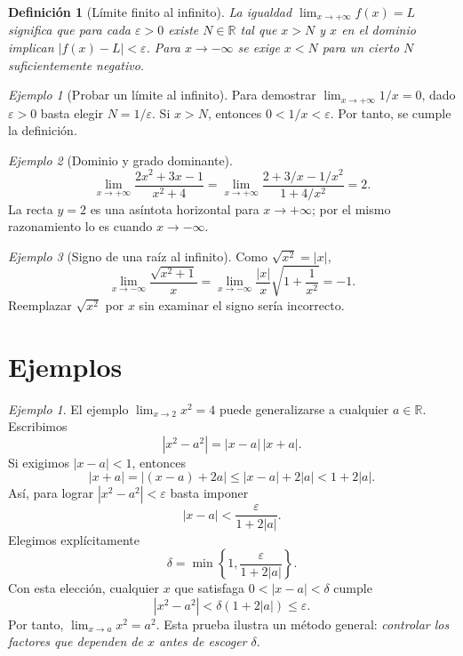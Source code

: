 \documentclass[12pt]{article}
\newtheorem{definicion}{Definición}[section]
\theoremstyle{remark}
\newtheorem{ejemplo}{Ejemplo}
\newtheorem{Ejem}{Ejemplo}
\newcommand{\R}{\mathbb{R}}
\begin{document}
\begin{definicion}[Límite finito al infinito]
La igualdad $\lim_{x\to+\infty}f(x)=L$ significa que para cada $\varepsilon>0$ existe $N\in\R$ tal que $x>N$ y $x$ en el dominio implican $|f(x)-L|<\varepsilon$. Para $x\to-\infty$ se exige $x<N$ para un cierto $N$ suficientemente negativo.
\end{definicion}

\begin{ejemplo}[Probar un límite al infinito]
Para demostrar $\lim_{x\to+\infty}1/x=0$, dado $\varepsilon>0$ basta elegir $N=1/\varepsilon$. Si $x>N$, entonces $0<1/x<\varepsilon$. Por tanto, se cumple la definición.
\end{ejemplo}

\begin{ejemplo}[Dominio y grado dominante]
\[
 \lim_{x\to+\infty}\frac{2x^2+3x-1}{x^2+4}
 =\lim_{x\to+\infty}\frac{2+3/x-1/x^2}{1+4/x^2}=\boxed2.
\]
La recta $y=2$ es una asíntota horizontal para $x\to+\infty$; por el mismo razonamiento lo es cuando $x\to-\infty$.
\end{ejemplo}

\begin{ejemplo}[Signo de una raíz al infinito]
Como $\sqrt{x^2}=|x|$,
\[
 \lim_{x\to-\infty}\frac{\sqrt{x^2+1}}x
 =\lim_{x\to-\infty}\frac{|x|}{x}\sqrt{1+\frac1{x^2}}
 =\boxed{-1}.
\]
Reemplazar $\sqrt{x^2}$ por $x$ sin examinar el signo sería incorrecto.
\end{ejemplo}



\section{Ejemplos}

\begin{Ejem}
El ejemplo $\lim_{x\to2}x^2=4$ puede generalizarse a cualquier $a\in\R$. Escribimos
\[
|x^2-a^2|=|x-a|\,|x+a|.
\]
Si exigimos $|x-a|<1$, entonces
\[
|x+a|=|(x-a)+2a|\le |x-a|+2|a|<1+2|a|.
\]
Así, para lograr $|x^2-a^2|<\varepsilon$ basta imponer
\[
|x-a|<\frac{\varepsilon}{1+2|a|}.
\]
Elegimos explícitamente
\[
\delta=\min\left\{1,\frac{\varepsilon}{1+2|a|}\right\}.
\]
Con esta elección, cualquier $x$ que satisfaga $0<|x-a|<\delta$ cumple
\[
|x^2-a^2|<\delta(1+2|a|)\le\varepsilon.
\]
Por tanto, $\lim_{x\to a}x^2=a^2$. Esta prueba ilustra un método general: \emph{controlar los factores que dependen de $x$ antes de escoger $\delta$}.
\end{Ejem}
\end{document}
